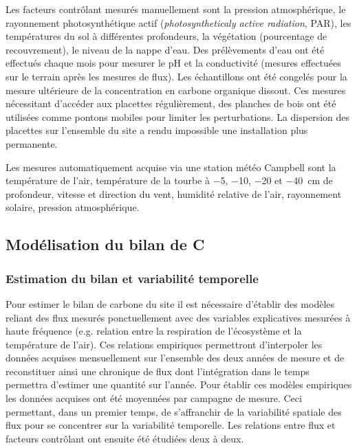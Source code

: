 Les facteurs contrôlant mesurés manuellement sont la pression atmosphérique, le rayonnement photosynthétique actif (\textit{photosyntheticaly active radiation}, PAR), les températures du sol à différentes profondeurs, la végétation (pourcentage de recouvrement), le niveau de la nappe d'eau.
Des prélèvements d'eau ont été effectués chaque mois pour mesurer le pH et la conductivité (mesures effectuées sur le terrain après les mesures de flux).
Les échantillons ont été congelés pour la mesure ultérieure de la concentration en carbone organique dissout.
Ces mesures nécessitant d'accéder aux placettes régulièrement, des planches de bois ont été utilisées comme pontons mobiles pour limiter les perturbations. La dispersion des placettes sur l'ensemble du site a rendu impossible une installation plus permanente.

Les mesures automatiquement acquise via une station météo Campbell sont la température de l'air, température de la tourbe à \num{-5}, \num{-10}, \num{-20} et \SI{-40}{\centi\metre} de profondeur, vitesse et direction du vent, humidité relative de l'air, rayonnement solaire, pression atmosphérique.

\subsection{Modélisation du bilan de C}

\subsubsection{Estimation du bilan et variabilité temporelle}

Pour estimer le bilan de carbone du site il est nécessaire d'établir des modèles reliant des flux mesurés ponctuellement avec des variables explicatives mesurées à haute fréquence (e.g. relation entre la respiration de l'écosystème et la température de l'air).
Ces relations empiriques permettront d'interpoler les données acquises mensuellement sur l'ensemble des deux années de mesure et de reconstituer ainsi une chronique de flux dont l'intégration dans le temps permettra d'estimer une quantité sur l'année.
Pour établir ces modèles empiriques les données acquises ont été moyennées par campagne de mesure.
Ceci permettant, dans un premier temps, de s'affranchir de la variabilité spatiale des flux pour se concentrer sur la variabilité temporelle.
Les relations entre flux et facteurs contrôlant ont ensuite été étudiées deux à deux.

